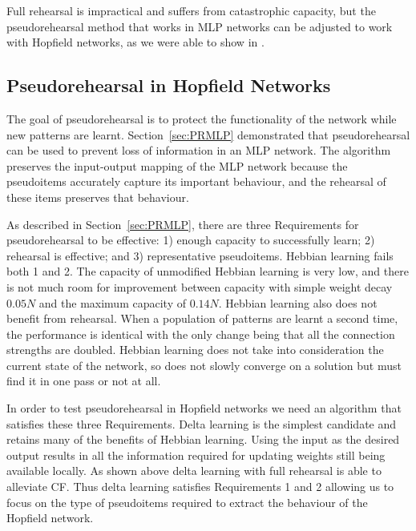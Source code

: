 Full rehearsal is impractical and suffers from catastrophic capacity, but the pseudorehearsal method that works in MLP networks can be adjusted to work with Hopfield networks, as we were able to show in \citet{Robins1998}. 


\subsection{Pseudorehearsal in Hopfield Networks}
\label{sec:PRAlg}

The goal of pseudorehearsal is to protect the functionality of the network while new patterns are learnt. Section~\ref{sec:PRMLP} demonstrated that pseudorehearsal can be used to prevent loss of information in an MLP network.  The algorithm preserves the input-output mapping of the MLP network because the pseudoitems accurately capture its important behaviour, and the rehearsal of these items preserves that behaviour.  

As described in Section~\ref{sec:PRMLP}, there are three Requirements for pseudorehearsal to be effective: 1) enough capacity to successfully learn; 2) rehearsal is effective; and 3) representative pseudoitems.  Hebbian learning fails both 1 and 2.  The capacity of unmodified Hebbian learning is very low, and there is not much room for improvement between capacity with simple weight decay $0.05N$ and the maximum capacity of $0.14N$.  Hebbian learning also does not benefit from rehearsal. When a population of patterns are learnt a second time, the performance is identical with the only change being that all the connection strengths are doubled.  Hebbian learning does not take into consideration the current state of the network, so does not slowly converge on a solution but must find it in one pass or not at all.

In order to test pseudorehearsal in Hopfield networks we need an algorithm that satisfies these three Requirements.  Delta learning is the simplest candidate and retains many of the benefits of Hebbian learning.  Using the input as the desired output results in all the information required for updating weights still being available locally.  As shown above delta learning with full rehearsal is able to alleviate CF.  Thus delta learning satisfies Requirements 1 and 2 allowing us to focus on the type of pseudoitems required to extract the behaviour of the Hopfield network.

